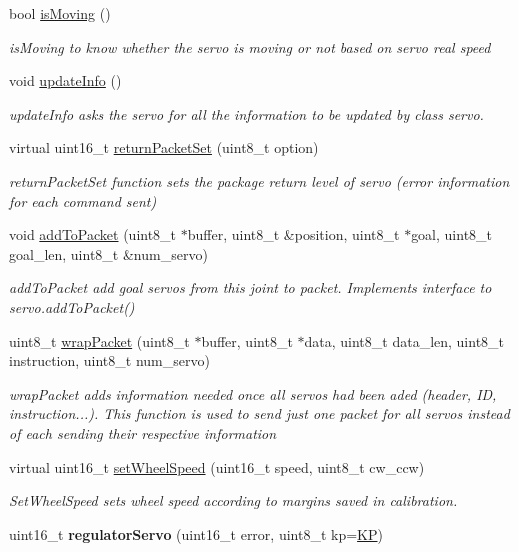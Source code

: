 \begin{DoxyCompactItemize}
bool \hyperlink{classServoRHA_a6935a684c935c92c255a96f51eb3c39d}{is\+Moving} ()
\begin{DoxyCompactList}\small\item\em is\+Moving to know whether the servo is moving or not based on servo real speed \end{DoxyCompactList}\item 
void \hyperlink{classServoRHA_abe4b7078a33b1f46d1f09a7b7edc6a45}{update\+Info} ()
\begin{DoxyCompactList}\small\item\em update\+Info asks the servo for all the information to be updated by class servo. \end{DoxyCompactList}\item 
virtual uint16\+\_\+t \hyperlink{classServoRHA_a63c7bd194a1bf8ff0196c8ea3f3a7c00}{return\+Packet\+Set} (uint8\+\_\+t option)
\begin{DoxyCompactList}\small\item\em return\+Packet\+Set function sets the package return level of servo (error information for each command sent) \end{DoxyCompactList}\item 
void \hyperlink{classServoRHA_a53068a57169a9c4dcb4fda8d426dd493}{add\+To\+Packet} (uint8\+\_\+t $\ast$buffer, uint8\+\_\+t \&position, uint8\+\_\+t $\ast$goal, uint8\+\_\+t goal\+\_\+len, uint8\+\_\+t \&num\+\_\+servo)
\begin{DoxyCompactList}\small\item\em add\+To\+Packet add goal servos from this joint to packet. Implements interface to servo.\+add\+To\+Packet() \end{DoxyCompactList}\item 
uint8\+\_\+t \hyperlink{classServoRHA_aafd8db25639b5351831e779064314507}{wrap\+Packet} (uint8\+\_\+t $\ast$buffer, uint8\+\_\+t $\ast$data, uint8\+\_\+t data\+\_\+len, uint8\+\_\+t instruction, uint8\+\_\+t num\+\_\+servo)
\begin{DoxyCompactList}\small\item\em wrap\+Packet adds information needed once all servos had been aded (header, ID, instruction...). This function is used to send just one packet for all servos instead of each sending their respective information \end{DoxyCompactList}\item 
virtual uint16\+\_\+t \hyperlink{classServoRHA_a750f89c94342e55b69bf746b7edc0abc}{set\+Wheel\+Speed} (uint16\+\_\+t speed, uint8\+\_\+t cw\+\_\+ccw)
\begin{DoxyCompactList}\small\item\em Set\+Wheel\+Speed sets wheel speed according to margins saved in calibration. \end{DoxyCompactList}\item 
uint16\+\_\+t {\bfseries regulator\+Servo} (uint16\+\_\+t error, uint8\+\_\+t kp=\hyperlink{servo__rha_8h_aa4729260b732666338dee7d841aa12f3}{KP})\hypertarget{classServoRHA_a3d9fd3b5d29fd4955f707cac77d43e91}{}\label{classServoRHA_a3d9fd3b5d29fd4955f707cac77d43e91}


\end{DoxyCompactItemize}
